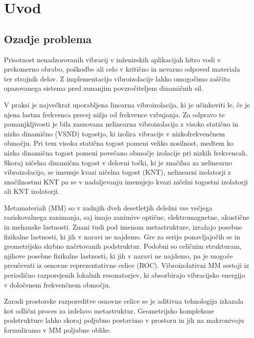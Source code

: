 \chapter{Uvod}\label{cha:uvod}
\section{Ozadje problema}\label{sec:ozadje_problema}
    
    Prisotnost nenadzorovanih vibracij v inženirskih aplikacijah hitro vodi v prekomerno obrabo, poškodbe ali celo v kritično in nevarno odpoved materiala ter strojnih delov. Z implementacijo vibroizolacije lahko omogočimo zaščito opazovanega sistema pred zunanjim povzročiteljem dinamičnih sil. 
    
    V praksi je največkrat uporabljena linearna vibroizolacija, ki je učinkoviti le, če je njena lastna frekvenca precej nižja od frekvence vzbujanja. Za odpravo te pomanjkljivosti je bila zasnovana nelinearna vibroizolacija z visoko statično in nizko dinamično (VSND) togostjo, ki izolira vibracije v nizkofrekvenčnem območju. Pri tem visoka statična togost pomeni veliko nosilnost, medtem ko nizka dinamična togost pomeni povečano območje izolacije pri nizkih frekvencah. Skoraj ničelna dinamična togost v delovni točki, ki je značilna za nelinearno vibroizolacijo, se imenuje kvazi ničelna togost (KNT), nelinearni izolatorji z značilnostmi KNT pa se v nadaljevanju imenujejo kvazi ničelni togostni izolatorji ali KNT izolatorji.
    
    Metamateriali (MM) so v zadnjih dveh desetletjih deležni vse večjega raziskovalnega zanimanja, saj imajo zanimive optične, elektromagnetne, akustične in mehanske lastnosti. Znani tudi pod imenom metastrukture, izražajo posebne fizikalne lastnosti, ki jih v naravi ne najdemo. Gre za serijo ponavljajočih se in geometrijsko skrbno načrtovanih podstruktur. Podobni so celičnim strukturam, njihove posebne fizikalne lastnosti, ki jih v naravi ne najdemo, pa je mogoče preučevati iz osnovne reprezentativne celice (ROC). Vibroizolativni MM sestoji iz periodično razporejenih lokalnih resonatorjev, ki absorbirajo vibracijsko energijo v določenem frekvenčnem območju. 
    
    Zaradi prostorske razporeditve osnovne celice se je aditivna tehnologija izkazala kot odlični proces za izdelavo metastruktur. Geometrijsko kompleksne podstrukture lahko skoraj poljubno postavimo v prostoru in jih na makronivoju formuliramo v MM poljubne oblike.

